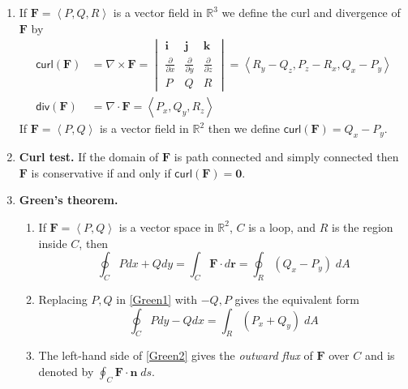 \documentclass[12pt]{article}
\begin{document}
\begin{enumerate}
\item If $\mathbold{F}=\left\langle P,Q,R\right\rangle$
is a vector field in $\mathbb{R}^3$
we define the curl and divergence of $\mathbold{F}$ by
\begin{align*}
\mathsf{curl}\left(\mathbold{F}\right)
&=\nabla\times\mathbold{F}
=\begin{vmatrix}
\mathbold{i}&\mathbold{j}&\mathbold{k}\\
\frac{\partial}{\partial x}&\frac{\partial}{\partial y}
&\frac{\partial}{\partial z}\\P&Q&R 
\end{vmatrix}
=\left\langle R_y-Q_z,P_z-R_x,Q_x-P_y\right\rangle\\
\mathsf{div}\left(\mathbold{F}\right)
&=\nabla\cdot\mathbold{F}=\left\langle P_x,Q_y,R_z\right\rangle
\end{align*}
If $\mathbold{F}=\left\langle P,Q\right\rangle$ 
is a vector field in $\mathbb{R}^2$
then we define
$\mathsf{curl}\left(\mathbold{F}\right)
=Q_x-P_y$.

\item{\bf Curl test.} If the domain of $\mathbold{F}$
is path connected and simply connected then
$\mathbold{F}$ is conservative if and only if $\mathsf{curl}
\left(\mathbold{F}\right)=\mathbold{0}$.

\item{\bf Green's theorem.}
\begin{enumerate}
\item If $\mathbold{F}=\left\langle P,Q\right\rangle$ is a vector
space in $\mathbb{R}^2$, $C$ is a loop,
and $R$ is the region inside $C$, then
\begin{equation}\label{Green1}
\oint_C Pdx+Qdy
=\int_C\mathbold{F}\cdot d\mathbold{r}
=\oint_R\left(Q_x-P_y\right)\;dA
\end{equation}
\item Replacing $P,Q$ in \autoref{Green1} with $-Q,P$ gives
the equivalent form
\begin{equation}\label{Green2}
\oint_C Pdy-Qdx
=\int_R\left(P_x+Q_y\right)\;dA
\end{equation}
\item The left-hand side of \autoref{Green2} gives
the {\em outward flux} of $\mathbold{F}$ over $C$
and is denoted by $\oint_C\mathbold{F}\cdot\mathbold{n}\;ds$.
\end{enumerate}


\end{enumerate}
\end{document}
